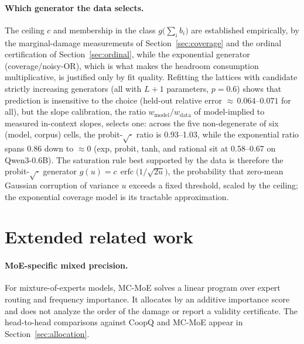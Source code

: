 \paragraph{Which generator the data selects.} The ceiling $c$ and membership in the class
$g\bigl(\sum_i b_i\bigr)$ are established empirically, by the marginal-damage measurements of
Section~\ref{sec:coverage} and the ordinal certification of Section~\ref{sec:ordinal}, while the
exponential generator (coverage/noisy-OR), which is what makes the headroom consumption multiplicative, is
justified only by
fit quality. Refitting the lattices with candidate strictly increasing generators (all with $L+1$
parameters, $p=0.6$) shows that prediction is insensitive to the choice (held-out relative error
${\approx}\,0.064$--$0.071$ for all), but the slope calibration, the ratio
$w_{\text{model}}/w_{\text{data}}$ of model-implied to measured in-context slopes, selects one: across
the five non-degenerate of six (model, corpus) cells, the probit-$\sqrt{\cdot}$ ratio is 0.93--1.03,
while the exponential ratio spans 0.86 down to ${\approx}0$ (exp, probit, tanh, and rational sit at
0.58--0.67 on Qwen3-0.6B). The saturation rule
best supported by the data is therefore the probit-$\sqrt{\cdot}$ generator
$g(u) = c\,\operatorname{erfc}\bigl(1/\sqrt{2u}\bigr)$, the probability that zero-mean Gaussian
corruption of variance $u$ exceeds a fixed threshold, scaled by the ceiling; the exponential coverage
model is its tractable approximation. 


\section{Extended related work}\label{app:related}

\paragraph{MoE-specific mixed precision.} For mixture-of-experts models, MC-MoE
\citep{mcmoe2025} solves a linear program over expert routing and frequency importance. It allocates by
an additive importance score and does not analyze the order of the damage or report a validity
certificate. The head-to-head comparisons against CoopQ and MC-MoE appear in
Section~\ref{sec:allocation}.

